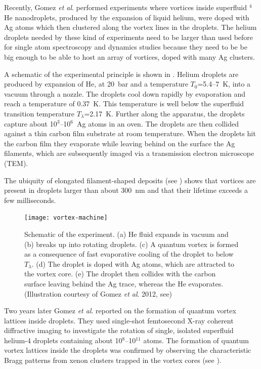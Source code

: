 	Recently, Gomez \emph{et al}. performed experiments\citep{Gomez:2012} where vortices inside superfluid $^4$He nanodroplets, produced by the expansion of liquid helium, were doped with Ag atoms which then clustered along the vortex lines in the droplets. The helium droplets needed by these kind of experiments need to be larger than used before for single atom spectroscopy and dynamics studies because they need to be be big enough to be able to host an array of vortices, doped with many Ag clusters.
	
	A schematic of the experimental principle is shown in . Helium droplets are produced by expansion of He, at 20~bar and a temperature $T_0$=5.4--7~K, into a vacuum through a nozzle. The droplets cool down rapidly by evaporation and reach a temperature of 0.37~K\citep{Hartmann1995}. This temperature is well below the superfluid transition temperature $T_\lambda$=2.17~K\citep{Don91,Pit03}. Further along the apparatus, the droplets capture about 10$^3$–10$^6$~Ag atoms in an oven\citep{Log11d}. The droplets are then collided against a thin carbon film substrate at room temperature\citep{Log11d}. When the droplets hit the carbon film they evaporate while leaving behind on the surface the Ag filaments, which are subsequently imaged via a transmission electron microscope (TEM).
	
	The ubiquity of elongated filament-shaped deposits (see ) shows that vortices are present in droplets larger than about 300~nm and that their lifetime exceeds a few milliseconds.
	
	\begin{figure}[t]
		\begin{center}
			\texttt{[image: vortex-machine]}
			\caption{Schematic of the experiment. (a) He fluid expands in vacuum and (b) breaks up into rotating droplets. (c) A quantum vortex is formed as a consequence of fast evaporative cooling of the droplet to below $T_\lambda$. (d) The droplet is doped with Ag atoms, which are attracted to the vortex core. (e) The droplet then collides with the carbon surface leaving behind the Ag trace, whereas the He evaporates. (Illustration courtesy of Gomez \emph{et al}. 2012, see)}
			\label{fig:vortex-machine}
		\end{center}
	\end{figure}	
	
	Two years later Gomez \emph{et al}. reported\citep{Gom14} on the formation of quantum vortex lattices inside droplets. They used single-shot femtosecond X-ray coherent diffractive imaging to investigate the rotation of single, isolated superfluid helium-4 droplets containing about 10$^8$--10$^{11}$ atoms. The formation of quantum vortex lattices inside the droplets was confirmed by observing the characteristic Bragg patterns from xenon clusters trapped in the vortex cores (see ).

